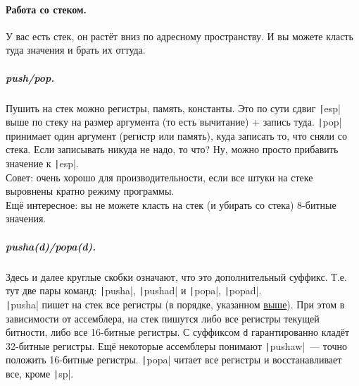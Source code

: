 \documentclass{article}
\begin{document}
    \paragraph{Работа со стеком.}
    У вас есть стек, он растёт вниз по адресному пространству. И вы можете класть туда значения и брать их оттуда.
    \subparagraph{push/pop.}
    Пушить на стек можно регистры, память, константы. Это по сути сдвиг \texttt|esp| выше по стеку на размер аргумента (то есть вычитание) + запись туда. \texttt|pop| принимает один аргумент (регистр или память), куда записать то, что сняли со стека. Если записывать никуда не надо, то что? Ну, можно просто прибавить значение к \texttt|esp|.\\
    Совет: очень хорошо для производительности, если все штуки на стеке выровнены кратно режиму программы.\\
    Ещё интересное: вы не можете класть на стек (и убирать со стека) 8-битные значения.
    \subparagraph{pusha(d)/popa(d).}
    Здесь и далее круглые скобки означают, что это дополнительный суффикс. Т.е. тут две пары команд: \texttt|pusha|, \texttt|pushad| и \texttt|popa|, \texttt|popad|.\\
    \texttt|pusha| пишет на стек все регистры (в порядке, указанном \hyperref[par:registers]{выше}). При этом в зависимости от ассемблера, на стек пишутся либо все регистры текущей битности, либо все 16-битные регистры. С суффиксом \Verb|d| гарантированно кладёт 32-битные регистры. Ещё некоторые ассемблеры понимают \texttt|pushaw|~--- точно положить 16-битные регистры. \texttt|popa| читает все регистры и восстанавливает все, кроме \texttt|sp|.
\end{document}
